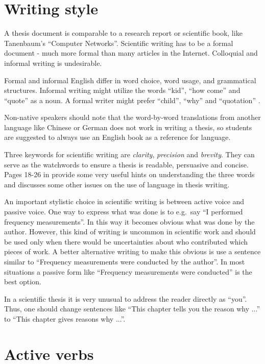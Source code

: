 \section{Writing style}

A thesis document is comparable to a research report or scientific book, like Tanenbaum's ``Computer Networks''. Scientific writing has to be a formal document - much more formal than many articles in the Internet. Colloquial and informal writing is undesirable.

Formal and informal English differ in word choice, word usage, and grammatical structures. Informal writing might utilize the words ``kid'', ``how come'' and ``quote'' as a noun. A formal writer might prefer ``child'', ``why'' and ``quotation'' \cite{sch96}. 

Non-native speakers should note that the word-by-word translations from another language like Chinese or German does not work in writing a thesis, so students are suggested to always use an English book as a reference for language.

Three keywords for scientific writing are \textit{clarity}, \textit{precision} and \textit{brevity}. They can serve as the watchwords to ensure a thesis is readable, persuasive and concise. Pages 18-26 in \cite{cha02} provide some very useful hints on understanding the three words and discusses some other issues on the use of language in thesis writing.

An important stylistic choice in scientific writing is between active voice and passive voice. One way to express what was done is to e.g.~say ``I performed frequency measurements''. In this way it becomes obvious what was done by the author. However, this kind of writing is uncommon in scientific work and should be used only when there would be uncertainties about who contributed which pieces of work. A better alternative writing to make this obvious is use a sentence similar to ``Frequency measurements were conducted by the author''. In most situations a passive form like ``Frequency measurements were conducted'' is the best option. 

In a scientific thesis it is very unusual to address the reader directly as ``you''. Thus, one should change sentences like ``This chapter tells you the reason why ...'' to ``This chapter gives reasons why ...''.

\section{Active verbs}


